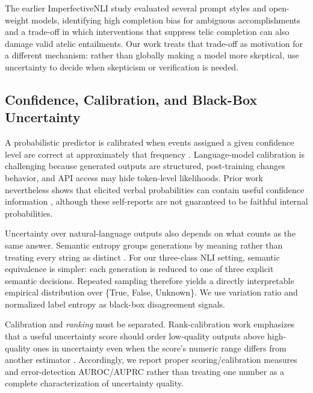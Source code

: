 \documentclass[letterpaper]{article}
\begin{document}
The earlier ImperfectiveNLI study evaluated several prompt styles and open-weight models, identifying high completion bias for ambiguous accomplishments and a trade-off in which interventions that suppress telic completion can also damage valid atelic entailments. Our work treats that trade-off as motivation for a different mechanism: rather than globally making a model more skeptical, use uncertainty to decide when skepticism or verification is needed.

\subsection{Confidence, Calibration, and Black-Box Uncertainty}
A probabilistic predictor is calibrated when events assigned a given confidence level are correct at approximately that frequency \citep{guo-etal-2017-calibration}. Language-model calibration is challenging because generated outputs are structured, post-training changes behavior, and API access may hide token-level likelihoods. Prior work nevertheless shows that elicited verbal probabilities can contain useful confidence information \citep{tian-etal-2023-calibration,xiong-etal-2024-uncertainty}, although these self-reports are not guaranteed to be faithful internal probabilities.

Uncertainty over natural-language outputs also depends on what counts as the same answer. Semantic entropy groups generations by meaning rather than treating every string as distinct \citep{farquhar-etal-2024-semantic}. For our three-class NLI setting, semantic equivalence is simpler: each generation is reduced to one of three explicit semantic decisions. Repeated sampling therefore yields a directly interpretable empirical distribution over \{True, False, Unknown\}. We use variation ratio and normalized label entropy as black-box disagreement signals.

Calibration and \emph{ranking} must be separated. Rank-calibration work emphasizes that a useful uncertainty score should order low-quality outputs above high-quality ones in uncertainty even when the score's numeric range differs from another estimator \citep{huang-etal-2024-rankcalibration}. Accordingly, we report proper scoring/calibration measures and error-detection AUROC/AUPRC rather than treating one number as a complete characterization of uncertainty quality.
\end{document}
